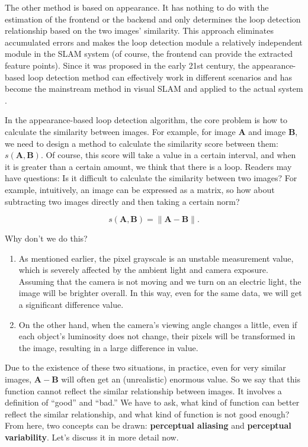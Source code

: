 The other method is based on appearance. It has nothing to do with the estimation of the frontend or the backend and only determines the loop detection relationship based on the two images' similarity. This approach eliminates accumulated errors and makes the loop detection module a relatively independent module in the SLAM system (of course, the frontend can provide the extracted feature points). Since it was proposed in the early 21st century, the appearance-based loop detection method can effectively work in different scenarios and has become the mainstream method in visual SLAM and applied to the actual system {\cite{Ulrich2000, Latif2013, Mur-Artal2015}}.

In the appearance-based loop detection algorithm, the core problem is how to calculate the similarity between images. For example, for image $\bm{A}$ and image $\bm{B}$, we need to design a method to calculate the similarity score between them: $s(\bm{A}, \bm{B })$. Of course, this score will take a value in a certain interval, and when it is greater than a certain amount, we think that there is a loop. Readers may have questions: Is it difficult to calculate the similarity between two images? For example, intuitively, an image can be expressed as a matrix, so how about subtracting two images directly and then taking a certain norm?

\begin{equation}
	s(\bm{A}, \bm{B}) = \| \bm{A}-\bm{B} \|.
\end{equation}

Why don't we do this?

\begin{enumerate}
	\item As mentioned earlier, the pixel grayscale is an unstable measurement value, which is severely affected by the ambient light and camera exposure. Assuming that the camera is not moving and we turn on an electric light, the image will be brighter overall. In this way, even for the same data, we will get a significant difference value.
	\item On the other hand, when the camera's viewing angle changes a little, even if each object's luminosity does not change, their pixels will be transformed in the image, resulting in a large difference in value.
\end{enumerate}

Due to the existence of these two situations, in practice, even for very similar images, $\bm{A}-\bm{B}$ will often get an (unrealistic) enormous value. So we say that this function {cannot reflect the similar relationship between images}. It involves a definition of ``good'' and ``bad.'' We have to ask, what kind of function can better reflect the similar relationship, and what kind of function is not good enough? From here, two concepts can be drawn: \textbf{perceptual aliasing} and \textbf{perceptual variability}. Let's discuss it in more detail now.

